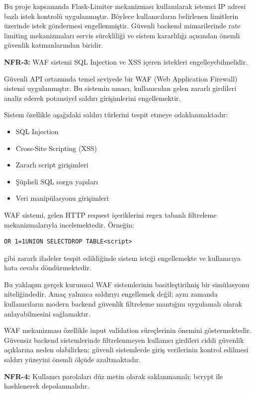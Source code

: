 Bu proje kapsamında Flask-Limiter mekanizması kullanılarak istemci IP adresi bazlı istek kontrolü uygulanmıştır. Böylece kullanıcıların belirlenen limitlerin üzerinde istek göndermesi engellenmiştir. Güvenli backend mimarilerinde rate limiting mekanizmaları servis sürekliliği ve sistem kararlılığı açısından önemli güvenlik katmanlarından biridir.

\noindent\textbf{NFR-3:} WAF sistemi SQL Injection ve XSS içeren istekleri engelleyebilmelidir.

Güvenli API ortamında temel seviyede bir WAF (Web Application Firewall) sistemi uygulanmıştır. Bu sistemin amacı, kullanıcıdan gelen zararlı girdileri analiz ederek potansiyel saldırı girişimlerini engellemektir.

Sistem özellikle aşağıdaki saldırı türlerini tespit etmeye odaklanmaktadır:

\begin{itemize}[leftmargin=*]
    \item SQL Injection
    \item Cross-Site Scripting (XSS)
    \item Zararlı script girişimleri
    \item Şüpheli SQL sorgu yapıları
    \item Veri manipülasyonu girişimleri
\end{itemize}

WAF sistemi, gelen HTTP request içeriklerini regex tabanlı filtreleme mekanizmalarıyla incelemektedir. Örneğin:

\begin{lstlisting}
OR 1=1UNION SELECTDROP TABLE<script>
\end{lstlisting}

gibi zararlı ifadeler tespit edildiğinde sistem isteği engellemekte ve kullanıcıya hata cevabı döndürmektedir.

Bu yaklaşım gerçek kurumsal WAF sistemlerinin basitleştirilmiş bir simülasyonu niteliğindedir. Amaç yalnızca saldırıyı engellemek değil; aynı zamanda kullanıcıların modern backend güvenlik filtreleme mantığını uygulamalı olarak anlayabilmesini sağlamaktır.

WAF mekanizması özellikle input validation süreçlerinin önemini göstermektedir. Güvensiz backend sistemlerinde filtrelenmeyen kullanıcı girdileri ciddi güvenlik açıklarına neden olabilirken; güvenli sistemlerde giriş verilerinin kontrol edilmesi saldırı yüzeyini önemli ölçüde azaltmaktadır.

\noindent\textbf{NFR-4:} Kullanıcı parolaları düz metin olarak saklanmamalı; bcrypt ile hashlenerek depolanmalıdır.

